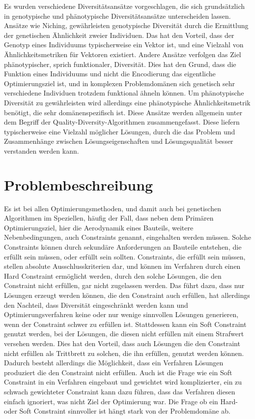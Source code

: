 \documentclass[12pt]{article}
\begin{document}
Es wurden verschiedene Diversitätsansätze vorgeschlagen, die sich grundsätzlich in genotypische und phänotypische Diversitätsansätze unterscheiden lassen.
Ansätze wie Niching, gewährleisten genotypische Diversität durch die Ermittlung der genetischen Ähnlichkeit zweier Individuen.
Das hat den Vorteil, dass der Genotyp eines Individuums typischerweise ein Vektor ist, und eine Vielzahl von Ähnlichkeitsmetriken für Vektoren existiert.
Andere Ansätze verfolgen das Ziel phänotypischer, sprich funktionaler, Diversität.
Dies hat den Grund, dass die Funktion eines Individuums und nicht die Encodierung das eigentliche Optimierungsziel ist,
und in komplexen Problemdomänen sich genetisch sehr verschiedene Individuen trotzdem funktional ähneln können.
Um phänotypische Diversität zu gewährleisten wird allerdings eine phänotypische Ähnlichkeitsmetrik benötigt, die sehr domänenspezifisch ist.
Diese Ansätze werden allgemein unter dem Begriff der Quality-Diversity-Algorithmen zusammengefasst.
Diese liefern typischerweise eine Vielzahl möglicher Lösungen, durch die das Problem und Zusammenhänge zwischen Lösungseigenschaften und Lösungsqualität besser verstanden werden kann.



\section{Problembeschreibung}

Es ist bei allen Optimierungsmethoden, und damit auch bei genetischen Algorithmen im Speziellen, häufig der Fall, dass neben dem Primären Optimierungsziel, hier die Aerodynamik eines Bauteils, weitere Nebenbedingungen, auch Constraints genannt, eingehalten werden müssen.
Solche Constraints können durch sekundäre Anforderungen an Bauteile entstehen, die erfüllt sein müssen, oder erfüllt sein sollten.
Constraints, die erfüllt sein müssen, stellen absolute Ausschlusskriterien dar, und können im Verfahren durch einen Hard Constraint ermöglicht werden, durch den solche Lösungen, die den Constraint nicht erfüllen, gar nicht zugelassen werden.
Das führt dazu, dass nur Lösungen erzeugt werden können, die den Constraint auch erfüllen, hat allerdings den Nachteil, dass Diversität eingeschränkt werden kann und Optimierungsverfahren keine oder nur wenige sinnvollen Lösungen generieren, wenn der Constraint schwer zu erfüllen ist.
Stattdessen kann ein Soft Constraint genutzt werden, bei der Lösungen, die diesen nicht erfüllen mit einem Strafwert versehen werden.
Dies hat den Vorteil, dass auch Lösungen die den Constraint nicht erfüllen als Trittbrett zu solchen, die ihn erfüllen, genutzt werden können.
Dadurch besteht allerdings die Möglichkeit, dass ein Verfahren Lösungen produziert die den Constraint nicht erfüllen.
Auch ist die Frage wie ein Soft Constraint in ein Verfahren eingebaut und gewichtet wird komplizierter, ein zu schwach gewichteter Constraint kann dazu führen, dass das Verfahren diesen einfach ignoriert, was nicht Ziel der Optimierung war.
Die Frage ob ein Hard- oder Soft Constraint sinnvoller ist hängt stark von der Problemdomäne ab.
\end{document}
